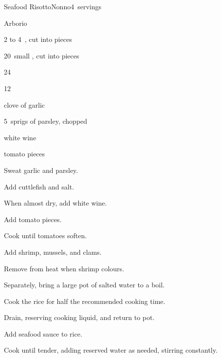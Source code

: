 \begin{recipe}{Seafood Risotto}{Nonno}{4~servings}

\begin{ingredients}
\item {} Arborio 
\item 2 to 4~, cut into \inch{\half} pieces
\item 20~small , cut into \inch{\half} pieces
\item 24~
\item 12~
\item clove of garlic
\item 5~sprigs of parsley, chopped
\item {} white wine
\item \ltr{\half} tomato pieces
\end{ingredients}

\begin{directions}
\item Sweat garlic and parsley.
\item Add cuttlefish and salt.
\item When almost dry, add white wine.
\item Add tomato pieces.
\item Cook until tomatoes soften.
\item Add shrimp, mussels, and clams.
\item Remove from heat when shrimp colours.
\item Separately, bring a large pot of salted water to a boil.
\item Cook the rice for half the recommended cooking time.
\item Drain, reserving cooking liquid, and return to pot.
\item Add seafood sauce to rice.
\item Cook until tender, adding reserved water as needed, stirring constantly.
\end{directions}

\end{recipe}
